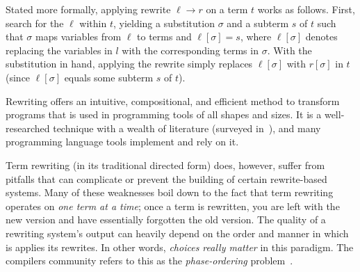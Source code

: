 Stated more formally,
 applying rewrite $\ell \to r$ on a term $t$
 works as follows.
First, search for the $\ell$ within $t$,
 yielding a substitution $\sigma$ and a subterm $s$ of $t$
 such that $\sigma$ maps variables from $\ell$ to terms
 and $\ell[\sigma] = s$,
 where $\ell[\sigma]$ denotes replacing the variables in $l$
 with the corresponding terms in $\sigma$.
With the substitution in hand,
 applying the rewrite simply replaces
 $\ell[\sigma]$ with $r[\sigma]$ in $t$
 (since $\ell[\sigma]$ equals some subterm $s$ of $t$).

Rewriting offers an
 intuitive, compositional, and efficient
 method to transform programs
 that is used in programming tools of all shapes and sizes.
It is a well-researched technique with a wealth of literature
 (surveyed in~\cite{nachum-rewrites, rewritesystems}),
 and many programming language tools implement and rely on it.

Term rewriting (in its traditional directed form) does, however,
 suffer from pitfalls that can complicate or prevent the building
 of certain rewrite-based systems.
Many of these weaknesses boil down to the fact that
 term rewriting operates on \emph{one term at a time};
 once a term is rewritten,
 you are left with the new version and have
 essentially forgotten the old version.
The quality of a rewriting system's output can heavily depend on
 the order and manner in which is applies its rewrites.
In other words, \emph{choices really matter} in this paradigm.
The compilers community refers to this as the
 \textit{phase-ordering} problem~\cite{eqsat}.

